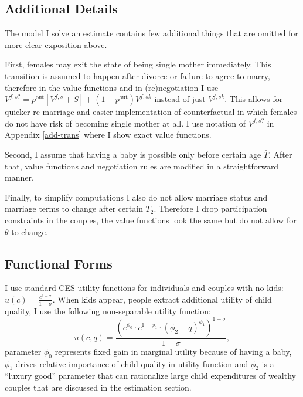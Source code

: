 \subsection{Additional Details}
The model I solve an estimate contains few additional things that are omitted for more clear exposition above.

First, females may exit the state of being single mother immediately. This transition is assumed to happen after divorce or failure to agree to marry, therefore in the value functions and in (re)negotiation I use $V^{f,s?} = p^{\text{out}} [V^{f,s} + S] + (1-p^{\text{out}})V^{f,sk}$ instead of just $V^{f,sk}$. This allows for quicker re-marriage and easier implementation of counterfactual in which females do not have risk of becoming single mother at all. I use notation of $V^{f,s?}$ in Appendix \ref{add-trans} where I show exact value functions.

Second, I assume that having a baby is possible only before certain age $\bar{T}$. After that, value functions and negotiation rules are modified in a straightforward manner.

Finally, to simplify computations I also do not allow marriage status and marriage terms to change after certain $\bar{T}_2$. Therefore I drop participation constraints in the couples, the value functions look the same but do not allow for $\theta$ to change.

\subsection{Functional Forms}
I use standard CES utility functions for individuals and couples with no kids: $u(c) = \frac{c^{1-\sigma}}{1-\sigma}$.  When kids appear, people extract additional utility of child quality, I use the following non-separable utility function:
\[u(c,q) = \frac{\left(e^{\phi_0}\cdot c^{1-\phi_1} \cdot (\phi_2 + q)^{\phi_1}\right)^{1-\sigma}}{1-\sigma},\]
parameter $\phi_0$ represents fixed gain in marginal utility because of having a baby, $\phi_1$ drives relative importance of child quality in utility function and $\phi_2$ is a ``luxury good'' parameter that can rationalize large child expenditures of wealthy couples that are discussed in the estimation section.